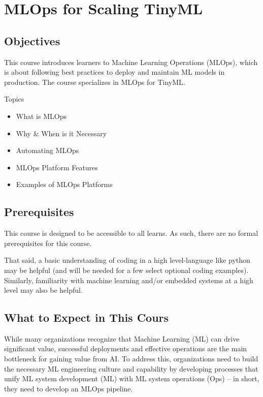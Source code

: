 


\chapter{MLOps for Scaling TinyML}

\section{Objectives}

This course introduces learners to Machine Learning Operations (MLOps), which is about following best practices to deploy and maintain ML models in production. The course specializes in MLOps for TinyML.

\bigskip

Topics

\bigskip

\begin{itemize}
  \item What is MLOps
  \item Why \& When is it Necessary
  \item Automating MLOps
  \item MLOps Platform Features
  \item Examples of MLOps Platforms
\end{itemize}

\section{Prerequisites}

This course is designed to be accessible to all learns. As such, there are no formal prerequisites for this course.

\bigskip

That said, a basic understanding of coding in a high level-language like python may be helpful (and will be needed for a few select optional coding examples). Similarly, familiarity with machine learning and/or embedded systems at a high level may also be helpful.


\section{What to Expect in This Cours}
    While many organizations recognize that Machine Learning (ML) can drive significant value, successful deployments and effective operations are the main bottleneck for gaining value from AI. To address this, organizations need to build the necessary ML engineering culture and capability by developing processes that unify ML system development (ML) with ML system operations (Ops) – in short, they need to develop an MLOps pipeline.
    
